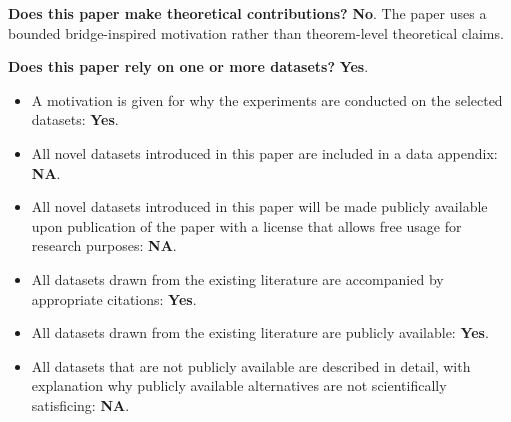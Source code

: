 ﻿\documentclass[letterpaper]{article}
\begin{document}
\noindent\textbf{Does this paper make theoretical contributions?} \textbf{No}. The paper uses a bounded bridge-inspired motivation rather than theorem-level theoretical claims.

\noindent\textbf{Does this paper rely on one or more datasets?} \textbf{Yes}.
\begin{itemize}
\item A motivation is given for why the experiments are conducted on the selected datasets: \textbf{Yes}.
\item All novel datasets introduced in this paper are included in a data appendix: \textbf{NA}.
\item All novel datasets introduced in this paper will be made publicly available upon publication of the paper with a license that allows free usage for research purposes: \textbf{NA}.
\item All datasets drawn from the existing literature are accompanied by appropriate citations: \textbf{Yes}.
\item All datasets drawn from the existing literature are publicly available: \textbf{Yes}.
\item All datasets that are not publicly available are described in detail, with explanation why publicly available alternatives are not scientifically satisficing: \textbf{NA}.
\end{itemize}
\end{document}
